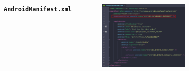 \documentclass{beamer}
\begin{document}
\begin{frame}
\begin{columns}
\begin{figure}
        \end{figure}
        \indent \textbf{\texttt{AndroidManifest.xml}}
        \begin{figure}
            \centering
            \includegraphics[width=\textwidth]{images/12.png}
        \end{figure}
    \end{columns}
\end{frame}
\end{document}
